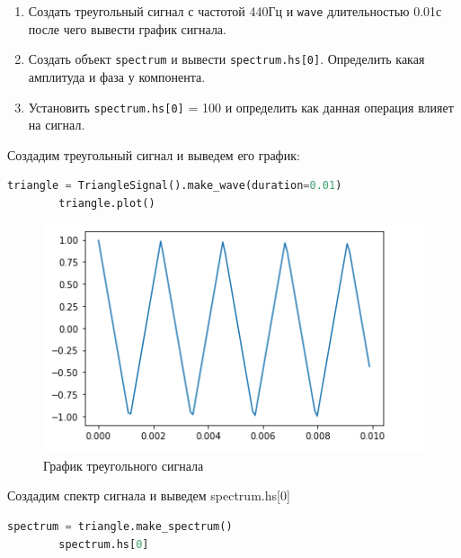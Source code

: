 \documentclass[a4paper, 14pt]{extarticle}
\begin{document}
    \begin{enumerate}
        \item Создать треугольный сигнал с частотой 440Гц и \texttt{wave} длительностью 0.01с после чего вывести график сигнала.
        \item Создать объект \texttt{spectrum} и вывести \texttt{spectrum.hs[0]}.
        Определить какая амплитуда и фаза у компонента.
        \item Установить \texttt{spectrum.hs[0]} = 100 и определить как данная операция влияет на сигнал.
    \end{enumerate}

    Создадим треугольный сигнал и выведем его график:

    \begin{lstlisting}[language=Python, caption= Создание и вывод на экран треугольного сигнала, label={lst:make_triangle_signal_plot}]
        triangle = TriangleSignal().make_wave(duration=0.01)
        triangle.plot()
    \end{lstlisting}

    \begin{figure}[H]
        \centering
        \includegraphics[width=\textwidth]{triangle_signal_plot}
        \caption{График треугольного сигнала}
        \label{fig:triangle_signal_plot}
    \end{figure}

    Создадим спектр сигнала и выведем spectrum.hs[0]

    \begin{lstlisting}[language=Python, caption= Создание спектра и вывод spectrum.hs, label={lst:create_spectrum_triangle_signal}]
        spectrum = triangle.make_spectrum()
        spectrum.hs[0]
    \end{lstlisting}
\end{document}
